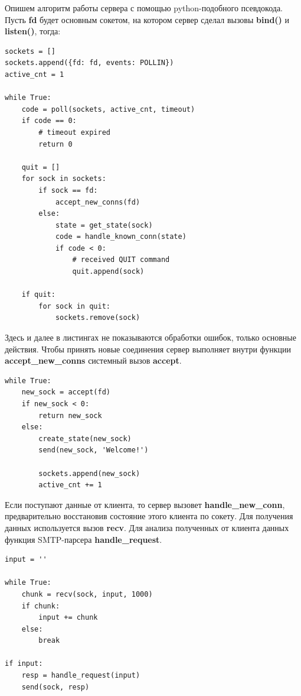 \documentclass[a4paper,12pt]{report}
\begin{document}
Опишем алгоритм работы сервера с помощью python-подобного псевдокода. Пусть \textbf{fd} будет основным сокетом, на котором сервер сделал вызовы \textbf{bind()} и \textbf{listen()}, тогда:

\begin{verbatim}
sockets = []
sockets.append({fd: fd, events: POLLIN})
active_cnt = 1

while True:
    code = poll(sockets, active_cnt, timeout)
    if code == 0:
        # timeout expired
        return 0

    quit = []
    for sock in sockets:
        if sock == fd:
            accept_new_conns(fd)
        else:
            state = get_state(sock)
            code = handle_known_conn(state) 
            if code < 0:
                # received QUIT command
                quit.append(sock)

    if quit:
        for sock in quit:
            sockets.remove(sock)
\end{verbatim}

Здесь и далее в листингах не показываются обработки ошибок, только основные действия. Чтобы принять новые соединения сервер выполняет внутри функции \textbf{accept\_new\_conns} системный вызов \textbf{accept}.

\begin{verbatim}
while True:
    new_sock = accept(fd)
    if new_sock < 0:
        return new_sock
    else:
        create_state(new_sock)
        send(new_sock, 'Welcome!')

        sockets.append(new_sock)
        active_cnt += 1
\end{verbatim}

Если поступают данные от клиента, то сервер вызовет \textbf{handle\_new\_conn}, предварительно восстановив состояние этого клиента по сокету. Для получения данных используется вызов \textbf{recv}. Для анализа полученных от клиента данных функция SMTP-парсера \textbf{handle\_request}.

\begin{verbatim}
input = ''

while True:
    chunk = recv(sock, input, 1000)
    if chunk:
        input += chunk
    else:
        break

if input:
    resp = handle_request(input)
    send(sock, resp)

\end{verbatim}

\end{document}
